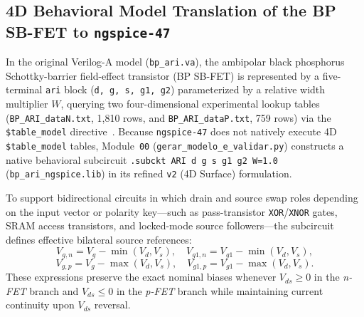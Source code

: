 \subsection{4D Behavioral Model Translation of the BP SB-FET to \texttt{ngspice-47}}\label{sec:met_model}

In the original Verilog-A model (\texttt{bp\_ari.va}), the ambipolar black phosphorus Schottky-barrier field-effect transistor (BP SB-FET) is represented by a five-terminal \texttt{ari} block (\texttt{d, g, s, g1, g2}) parameterized by a relative width multiplier $W$, querying two four-dimensional experimental lookup tables (\texttt{BP\_ARI\_\allowbreak dataN.txt}, 1,810 rows, and \texttt{BP\_ARI\_\allowbreak dataP.txt}, 759 rows) via the \texttt{\$table\_model} directive~\cite{wu2020reconfigurable}. Because \texttt{ngspice-47} does not natively execute 4D \texttt{\$table\_model} tables, Module~\texttt{00} (\texttt{gerar\_\allowbreak modelo\_\allowbreak e\_\allowbreak validar.py}) constructs a native behavioral subcircuit \texttt{.subckt ARI d g s g1 g2 W=1.0} (\texttt{bp\_ari\_\allowbreak ngspice.lib}) in its refined \texttt{v2} (4D Surface) formulation.

To support bidirectional circuits in which drain and source swap roles depending on the input vector or polarity key---such as pass-transistor \texttt{XOR}/\texttt{XNOR} gates, SRAM access transistors, and locked-mode source followers---the subcircuit defines effective bilateral source references:
\begin{equation}\label{eq:bilateral_ref}
V_{g,n} = V_g - \min(V_d, V_s), \quad V_{g1,n} = V_{g1} - \min(V_d, V_s),
\end{equation}
\begin{equation}\label{eq:bilateral_ref_p}
V_{g,p} = V_g - \max(V_d, V_s), \quad V_{g1,p} = V_{g1} - \max(V_d, V_s).
\end{equation}
These expressions preserve the exact nominal biases whenever $V_{ds} \ge 0$ in the \textit{n-FET} branch and $V_{ds} \le 0$ in the \textit{p-FET} branch while maintaining current continuity upon $V_{ds}$ reversal.


